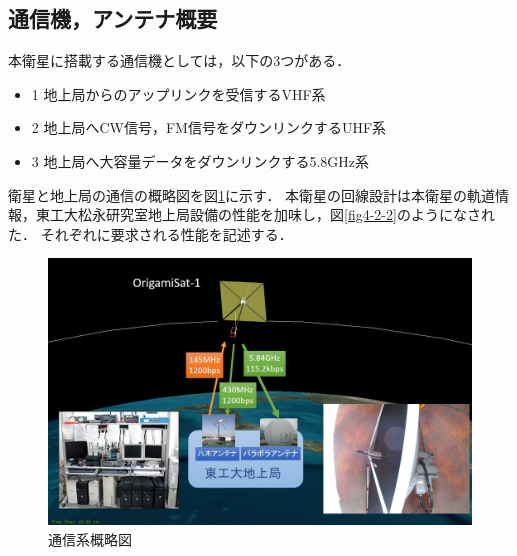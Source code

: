 \subsection{通信機，アンテナ概要}

本衛星に搭載する通信機としては，以下の3つがある．
\begin{itemize}
	\item {1} 地上局からのアップリンクを受信するVHF系
	\item {2} 地上局へCW信号，FM信号をダウンリンクするUHF系
	\item {3} 地上局へ大容量データをダウンリンクする5.8GHz系
\end{itemize}

衛星と地上局の通信の概略図を図\ref{fig4-2-1}に示す．
本衛星の回線設計は本衛星の軌道情報，東工大松永研究室地上局設備の性能を加味し，図\ref{fig4-2-2}のようになされた．
それぞれに要求される性能を記述する．
\begin{figure}[H]
	\centering
	\includegraphics[scale=0.5]{03/fig/4-2-1.jpg}
	\caption{通信系概略図}
	\label{fig4-2-1}
\end{figure}
